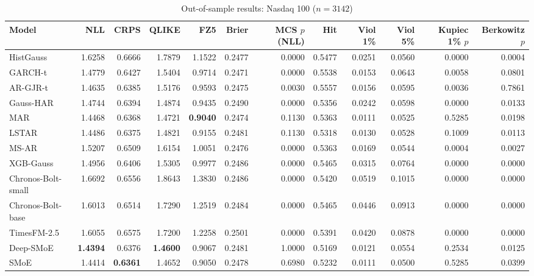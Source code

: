 \begin{table}[!htbp]\centering\scriptsize
\caption{Out-of-sample results: Nasdaq 100 ($n=3142$)}\label{tab:asset_ndx}
\begin{adjustbox}{max width=\textwidth}
\begin{tabular}{lrrrrrrrrrrr}
\toprule
Model & NLL & CRPS & QLIKE & FZ5 & Brier & MCS $p$ (NLL) & Hit & Viol 1\% & Viol 5\% & Kupiec 1\% $p$ & Berkowitz $p$\\
\midrule
HistGauss & 1.6258 & 0.6666 & 1.7879 & 1.1522 & 0.2477 & 0.0000 & 0.5477 & 0.0251 & 0.0560 & 0.0000 & 0.0004\\
GARCH-t & 1.4779 & 0.6427 & 1.5404 & 0.9714 & 0.2471 & 0.0000 & 0.5538 & 0.0153 & 0.0643 & 0.0058 & 0.0801\\
AR-GJR-t & 1.4635 & 0.6385 & 1.5176 & 0.9593 & 0.2475 & 0.0030 & 0.5557 & 0.0156 & 0.0595 & 0.0036 & 0.7861\\
Gauss-HAR & 1.4744 & 0.6394 & 1.4874 & 0.9435 & 0.2490 & 0.0000 & 0.5356 & 0.0242 & 0.0598 & 0.0000 & 0.0133\\
MAR & 1.4468 & 0.6368 & 1.4721 & \textbf{0.9040} & 0.2474 & 0.1130 & 0.5363 & 0.0111 & 0.0525 & 0.5285 & 0.0198\\
LSTAR & 1.4486 & 0.6375 & 1.4821 & 0.9155 & 0.2481 & 0.1130 & 0.5318 & 0.0130 & 0.0528 & 0.1009 & 0.0113\\
MS-AR & 1.5207 & 0.6509 & 1.6154 & 1.0051 & 0.2476 & 0.0000 & 0.5363 & 0.0169 & 0.0544 & 0.0004 & 0.0027\\
XGB-Gauss & 1.4956 & 0.6406 & 1.5305 & 0.9977 & 0.2486 & 0.0000 & 0.5465 & 0.0315 & 0.0764 & 0.0000 & 0.0000\\
Chronos-Bolt-small & 1.6692 & 0.6556 & 1.8643 & 1.3830 & 0.2486 & 0.0000 & 0.5420 & 0.0519 & 0.1015 & 0.0000 & 0.0000\\
Chronos-Bolt-base & 1.6013 & 0.6514 & 1.7290 & 1.2519 & 0.2484 & 0.0000 & 0.5465 & 0.0446 & 0.0913 & 0.0000 & 0.0000\\
TimesFM-2.5 & 1.6055 & 0.6575 & 1.7200 & 1.2258 & 0.2501 & 0.0000 & 0.5391 & 0.0420 & 0.0878 & 0.0000 & 0.0000\\
Deep-SMoE & \textbf{1.4394} & 0.6376 & \textbf{1.4600} & 0.9067 & 0.2481 & 1.0000 & 0.5169 & 0.0121 & 0.0554 & 0.2534 & 0.0125\\
SMoE & 1.4414 & \textbf{0.6361} & 1.4652 & 0.9050 & 0.2478 & 0.6980 & 0.5232 & 0.0111 & 0.0500 & 0.5285 & 0.0399\\
\bottomrule
\end{tabular}
\end{adjustbox}
\end{table}